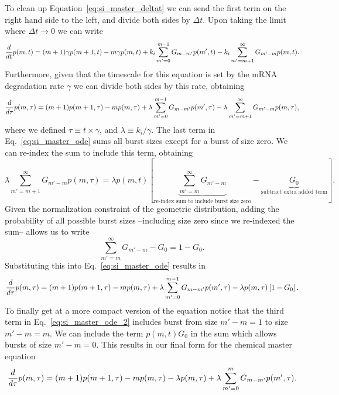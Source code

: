 To clean up Equation~\ref{eq:si_master_deltat} we can send the first term on the
right hand side to the left, and divide both sides by $\Delta t$. Upon taking
the limit where $\Delta t \rightarrow 0$ we can write
\begin{equation}
{d \over dt}p(m, t) = (m + 1) \gamma p(m + 1, t)
- m \gamma p(m, t)
+ k_i \sum_{m'=0}^{m-1} G_{m-m'} p(m', t) 
- k_i \sum_{m'=m + 1}^{\infty} G_{m'-m} p(m, t).
\end{equation}
Furthermore, given that the timescale for this equation is set by the mRNA
degradation rate $\gamma$ we can divide both sides by this rate, obtaining
\begin{equation}
{d \over d\tau}p(m, \tau) = (m + 1) p(m + 1, \tau)
- m p(m, \tau)
+ \lambda \sum_{m'=0}^{m-1} G_{m-m'} p(m', \tau) 
- \lambda \sum_{m'=m + 1}^{\infty} G_{m'-m} p(m, \tau),
\label{eq:si_master_ode}
\end{equation}
where we defined $\tau \equiv t \times \gamma$, and $\lambda \equiv k_i/\gamma$.
The last term in Eq.~\ref{eq:si_master_ode} sums all burst sizes except for a 
burst of size zero. We can re-index the sum to include this term, obtaining
\begin{equation}
\lambda \sum_{m'=m + 1}^{\infty} G_{m'-m} p(m, \tau) = \lambda p(m, t) \left[
\underbrace{\sum_{m'={m}}^{\infty}G_{m'-m}}
_{\text{re-index sum to include burst size zero}} -
\underbrace{G_0}_{\text{subtract extra added term}}\right].
\end{equation}
Given the normalization constraint of the geometric distribution, adding the
probability of all possible burst sizes --including size zero since we
re-indexed the sum-- allows us to write
\begin{equation}
\sum_{m'=m}^{\infty}G_{m'-m} - G_0 = 1 - G_0.
\end{equation}
Substituting this into Eq.~\ref{eq:si_master_ode} results in
\begin{equation}
{d \over d\tau}p(m, \tau) = (m + 1) p(m + 1, \tau)
- m p(m, \tau)
+ \lambda \sum_{m'=0}^{m-1} G_{m-m'} p(m', \tau) 
- \lambda p(m, \tau) \left[ 1 - G_0 \right].
\label{eq:si_master_ode_2}
\end{equation}
To finally get at a more compact version of the equation notice that the third
term in Eq.~\ref{eq:si_master_ode_2} includes burst from size $m'-m = 1$ to size
$m' - m = m$. We can include the term $p(m, t) G_0$ in the sum which allows
bursts of size $m' - m = 0$. This results in our final form for the chemical
master equation
\begin{equation}
{d \over d\tau}p(m, \tau) = 
(m + 1) p(m+1, \tau)
- m p(m, \tau) - 
\lambda p(m, \tau)
+ \lambda \sum_{m^\prime=0}^m G_{m-m^\prime} p(m^\prime, \tau).
\label{eq:si_master_unreg}
\end{equation}

